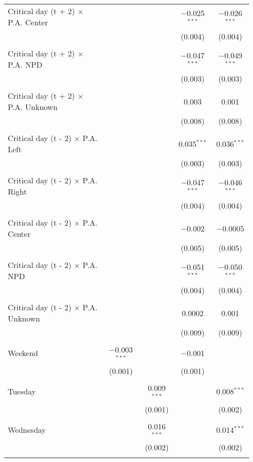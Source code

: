 \documentclass[
]{article}
\begin{document}
\begin{table}[!htbp]
{\begin{tabular}{@{\extracolsep{5pt}}lcccc}
 Critical day (t + 2) $\times$ P.A. Center &  &  & $-$0.025$^{***}$ & $-$0.026$^{***}$ \\ 
  &  &  & (0.004) & (0.004) \\ 
  & & & & \\ 
 Critical day (t + 2) $\times$ P.A. NPD &  &  & $-$0.047$^{***}$ & $-$0.049$^{***}$ \\ 
  &  &  & (0.003) & (0.003) \\ 
  & & & & \\ 
 Critical day (t + 2) $\times$ P.A. Unknown &  &  & 0.003 & 0.001 \\ 
  &  &  & (0.008) & (0.008) \\ 
  & & & & \\ 
 Critical day (t - 2) $\times$ P.A. Left &  &  & 0.035$^{***}$ & 0.036$^{***}$ \\ 
  &  &  & (0.003) & (0.003) \\ 
  & & & & \\ 
 Critical day (t - 2) $\times$ P.A. Right &  &  & $-$0.047$^{***}$ & $-$0.046$^{***}$ \\ 
  &  &  & (0.004) & (0.004) \\ 
  & & & & \\ 
 Critical day (t - 2) $\times$ P.A. Center &  &  & $-$0.002 & $-$0.0005 \\ 
  &  &  & (0.005) & (0.005) \\ 
  & & & & \\ 
 Critical day (t - 2) $\times$ P.A. NPD &  &  & $-$0.051$^{***}$ & $-$0.050$^{***}$ \\ 
  &  &  & (0.004) & (0.004) \\ 
  & & & & \\ 
 Critical day (t - 2) $\times$ P.A. Unknown &  &  & 0.0002 & 0.001 \\ 
  &  &  & (0.009) & (0.009) \\ 
  & & & & \\ 
 Weekend & $-$0.003$^{***}$ &  & $-$0.001 &  \\ 
  & (0.001) &  & (0.001) &  \\ 
  & & & & \\ 
 Tuesday &  & 0.009$^{***}$ &  & 0.008$^{***}$ \\ 
  &  & (0.001) &  & (0.002) \\ 
  & & & & \\ 
 Wednesday &  & 0.016$^{***}$ &  & 0.014$^{***}$ \\ 
  &  & (0.002) &  & (0.002) \\ 
  & & & & \\ 

\end{tabular}}
\end{table}
\end{document}
